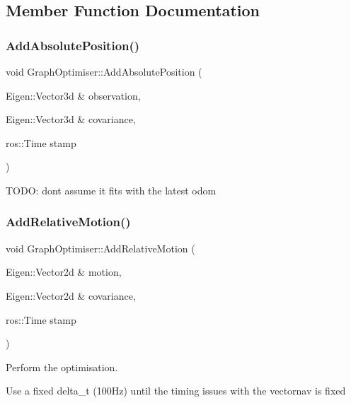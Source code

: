 \subsection{Member Function Documentation}
\mbox{\label{classGraphOptimiser_addfbfde9e277dd61876e64fd23c7eae8}} 
\subsubsection{\texorpdfstring{Add\+Absolute\+Position()}{AddAbsolutePosition()}}
{\footnotesize\ttfamily void Graph\+Optimiser\+::\+Add\+Absolute\+Position (\begin{DoxyParamCaption}\item[{Eigen\+::\+Vector3d \&}]{observation,  }\item[{Eigen\+::\+Vector3d \&}]{covariance,  }\item[{ros\+::\+Time}]{stamp }\end{DoxyParamCaption})}

T\+O\+DO\+: don\textquotesingle{}t assume it fits with the latest odom \mbox{\label{classGraphOptimiser_ad856bbb20088fae667b00f8ef0355f32}} 
\subsubsection{\texorpdfstring{Add\+Relative\+Motion()}{AddRelativeMotion()}}
{\footnotesize\ttfamily void Graph\+Optimiser\+::\+Add\+Relative\+Motion (\begin{DoxyParamCaption}\item[{Eigen\+::\+Vector2d \&}]{motion,  }\item[{Eigen\+::\+Vector2d \&}]{covariance,  }\item[{ros\+::\+Time}]{stamp }\end{DoxyParamCaption})}



Perform the optimisation. 

Use a fixed delta\+\_\+t (100\+Hz) until the timing issues with the vectornav is fixed


